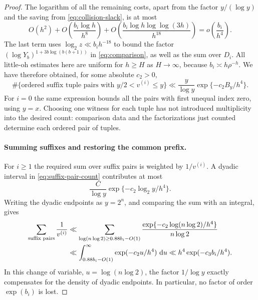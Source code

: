 \begin{proof}
The logarithm of all the remaining costs, apart from the factor
$y/(\log y)$ and the saving from \eqref{eq:collision-slack}, is at most
\begin{equation}\label{eq:collision-costs}
 O(h^2)+O\left(\frac{b_i\log h}{h^8}\right)
       +O\left(\frac{b_i\log h\log\log(3h)}{h^{18}}\right)
       =o\left(\frac{b_i}{h^4}\right).
\end{equation}
The last term uses
$\log_2z\ll b_i h^{-18}$ to bound the factor
$(\log Y_b)^{1+3b\log(b(b+1))}$ in \eqref{eq:comparison}, as well
as the sum over $D_i$.  All little-oh estimates here are uniform for
$h\ge H$ as $H\to\infty$, because $b_i\asymp h\rho^{-h}$.
We have therefore obtained, for some absolute $c_2>0$,
\begin{equation}\label{eq:suffix-pair-count}
 \#\{\text{ordered suffix tuple pairs with }y/2<v^{(i)}\le y\}
 \ll\frac{y}{\log y}\exp\{-c_2B_y/h^4\}.
\end{equation}
For $i=0$ the same expression bounds all the pairs with first unequal
index zero, using $y=x$.  Choosing one witness for each tuple has not
introduced multiplicity into the desired count: comparison data and
the factorizations just counted determine each ordered pair of tuples.

\paragraph{Summing suffixes and restoring the common prefix.}
For $i\ge1$ the required sum over suffix pairs is weighted by
$1/v^{(i)}$.  A dyadic interval in \eqref{eq:suffix-pair-count}
contributes at most
\[
 \frac{C}{\log y}\exp\{-c_2\log_2y/h^4\}.
\]
Writing the dyadic endpoints as $y=2^n$, and comparing the sum with
an integral, gives
\begin{align}
 \sum_{\text{suffix pairs}}\frac1{v^{(i)}}
 &\ll\sum_{\log(n\log2)\ge0.88b_i-O(1)}
       \frac{\exp\{-c_2\log(n\log2)/h^4\}}{n\log2}\notag\\
 &\ll\int_{0.88b_i-O(1)}^\infty\exp(-c_2u/h^4)\,\,\mathrm d u
  \ll h^4\exp(-c_3b_i/h^4).
 \label{eq:dyadic-suffix-mass}
\end{align}
In this change of variable, $u=\log(n\log2)$, the factor
$1/\log y$ exactly compensates for the density of dyadic endpoints.
In particular, no factor of order $\exp(b_i)$ is lost.


\end{proof}
